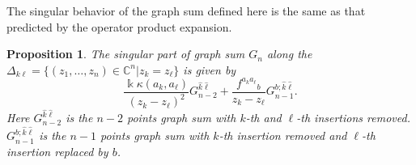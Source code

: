 \documentclass[11pt,a4paper]{amsart}
\numberwithin{equation}{section}
\newtheorem{proposition}[theorem]{Proposition}
\theoremstyle{definition}
\theoremstyle{remark}
\newcommand{\CC}{\mathbb C}
\newcommand{\kk}{\Bbbk}
\begin{document}
The singular behavior of the graph sum defined here is the same as that predicted by the operator product expansion.
\begin{proposition}
The singular part of graph sum $G_n$ along the $\Delta_{k\ell}=\{(z_1,\ldots,z_n)\in\CC^n| z_k=z_\ell \}$ is given by
\begin{equation}
 \frac{\kk\kappa(a_k,a_\ell)}{(z_k-z_\ell)^2}G_{n-2}^{\widehat k\widehat\ell}
 +\frac{f^{a_ka_\ell}{}_{b}}{z_k-z_\ell}
  G_{n-1}^{b;\widehat k\widehat\ell}.
\label{eq:candidate-principal-part}
\end{equation}
Here $G_{n-2}^{\widehat k\widehat\ell}$ is the $n-2$ points graph sum with $k$-th and $\ell$-th insertions removed. $G_{n-1}^{b;\widehat k\widehat\ell}$ is the $n-1$ points graph sum with $k$-th insertion removed and $\ell$-th insertion replaced by $b$.
\end{proposition}
\end{document}
